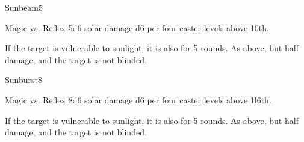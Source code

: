\begin{spellsection}{Sunbeam}{5}
\begin{spellheader}
    \begin{spelltargetinginfo}
    \end{spelltargetinginfo}
\end{spellheader}
\begin{spellcontent}
    \begin{spelleffects}
        \begin{spellattack}{Magic vs. Reflex}
            \spellsuccess 5d6 solar damage \add d6 per four caster levels above 10th.

            If the target is vulnerable to sunlight, it is also \blinded for 5 rounds.
            \spellfailure As above, but half damage, and the target is not blinded.
        \end{spellattack}
    \end{spelleffects}
\end{spellcontent}
\begin{spellfooter}
\end{spellfooter}
\end{spellsection}

\begin{spellsection}{Sunburst}{8}
\begin{spellheader}
    \begin{spelltargetinginfo}
    \end{spelltargetinginfo}
\end{spellheader}
\begin{spellcontent}
    \begin{spelleffects}
        \begin{spellattack}{Magic vs. Reflex}
            \spellsuccess 8d6 solar damage \add d6 per four caster levels above 1l6th.

            If the target is vulnerable to sunlight, it is also \blinded for 5 rounds.
            \spellfailure As above, but half damage, and the target is not blinded.
        \end{spellattack}
    \end{spelleffects}
\end{spellcontent}
\begin{spellfooter}
\end{spellfooter}

\begin{comment}
\subsubsection{T}
\end{comment}
\end{spellsection}

